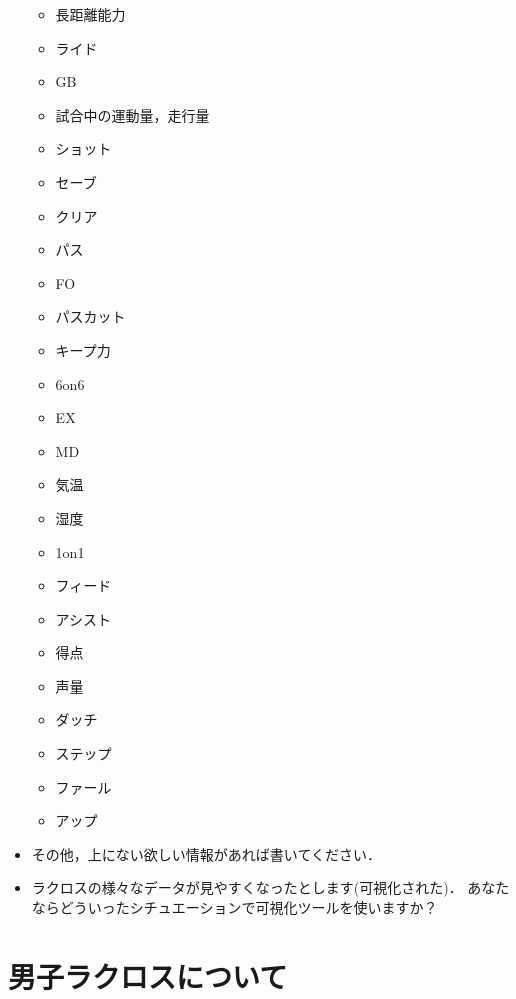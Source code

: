 \documentclass[sotsuron]{kuee}
\begin{document}
\begin{itemize}
\begin{itemize}
				\item 長距離能力
				\item ライド
				\item GB
				\item 試合中の運動量，走行量
				\item ショット
				\item セーブ
				\item クリア
				\item パス
				\item FO
				\item パスカット
				\item キープ力
				\item 6on6
				\item EX
				\item MD
				\item 気温
				\item 湿度
				\item 1on1
				\item フィード
				\item アシスト
				\item 得点
				\item 声量
				\item ダッチ
				\item ステップ
				\item ファール
				\item アップ
			\end{itemize}
		\item その他，上にない欲しい情報があれば書いてください．
		\item ラクロスの様々なデータが見やすくなったとします(可視化された)． あなたならどういったシチュエーションで可視化ツールを使いますか？
	\end{itemize}

\chapter{男子ラクロスについて}
\end{document}
